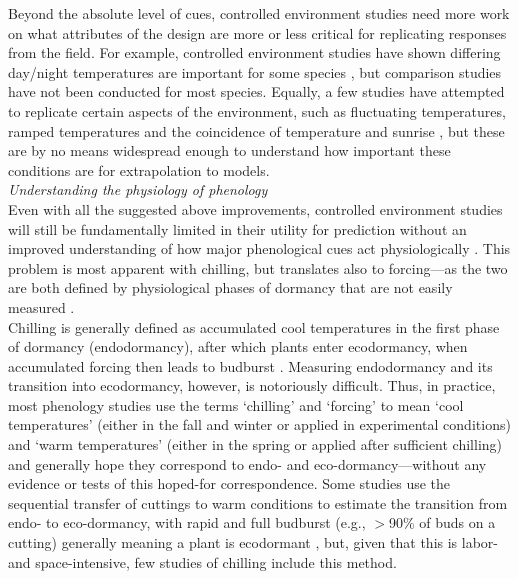 \documentclass[11pt,letter]{article}
\begin{document}
Beyond the absolute level of cues, controlled environment studies need more work on what attributes of the design are more or less critical for replicating responses from the field. For example, controlled environment studies have shown differing day/night temperatures are important for some species \citep{heuvelink1989influence,abrol1996effects,Thingnaes2003,pressman2006exposing}, but comparison studies have not been conducted for most species. Equally, a few studies have attempted to replicate certain aspects of the environment, such as fluctuating temperatures, ramped temperatures and the coincidence of temperature and sunrise \citep{erwin1998}, but these are by no means widespread enough to understand how important these conditions are for extrapolation to models. \\

\emph{Understanding the physiology of phenology}\\
Even with all the suggested above improvements, controlled environment studies will still be fundamentally limited in their utility for prediction without an improved understanding of how major phenological cues act physiologically \citep{Bahuguna2015}. This problem is most apparent with chilling, but translates also to forcing---as the two are both defined by physiological phases of dormancy that are not easily measured \citep{singh2019,chang2021}. \\

Chilling is generally defined as accumulated cool temperatures in the first phase of dormancy (endodormancy), after which plants enter ecodormancy, when accumulated forcing then leads to budburst \citep{chuine2016}. Measuring endodormancy and its transition into ecodormancy, however, is notoriously difficult. Thus, in practice, most phenology studies use the terms `chilling' and `forcing' to mean `cool temperatures' (either in the fall and winter or applied in experimental conditions) and `warm temperatures' (either in the spring or applied after sufficient chilling) and generally hope they correspond to endo- and eco-dormancy---without any evidence or tests of this hoped-for correspondence. Some studies use the sequential transfer of cuttings to warm conditions to estimate the transition from endo- to eco-dormancy, with rapid and full budburst (e.g., $>$90\% of buds on a cutting) generally meaning a plant is ecodormant \citep[e.g.,][]{Junttila:2012aa}, but, given that this is labor- and space-intensive, few studies of chilling include this method. \\
\end{document}
